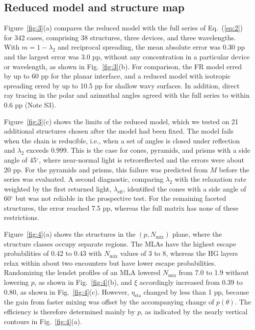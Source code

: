 \documentclass{optica-article}
\begin{document}
\subsection{Reduced model and structure map}

Figure~\ref{fig:3}(a) compares the reduced model with the full series of Eq.~(\ref{eq:2}) for 342 cases, comprising 38 structures, three devices, and three wavelengths. With $m = 1-\lambda_2$ and reciprocal spreading, the mean absolute error was 0.30 pp and the largest error was 3.0 pp, without any concentration in a particular device or wavelength, as shown in Fig.~\ref{fig:3}(b). For comparison, the FR model erred by up to 60 pp for the planar interface, and a reduced model with isotropic spreading erred by up to 10.5 pp for shallow wavy surfaces. In addition, direct ray tracing in the polar and azimuthal angles agreed with the full series to within 0.6 pp (Note S3).

Figure~\ref{fig:3}(c) shows the limits of the reduced model, which we tested on 21 additional structures chosen after the model had been fixed. The model fails when the chain is reducible, i.e., when a set of angles is closed under reflection and $\lambda_2$ exceeds 0.999. This is the case for cones, pyramids, and prisms with a side angle of 45\ensuremath{^\circ}, where near-normal light is retroreflected and the errors were about 20 pp. For the pyramids and prisms, this failure was predicted from $M$ before the series was evaluated. A second diagnostic, comparing $\lambda_2$ with the relaxation rate weighted by the first returned light, $\lambda_{\mathrm{eff}}$, identified the cones with a side angle of 60\ensuremath{^\circ} but was not reliable in the prospective test. For the remaining faceted structures, the error reached 7.5 pp, whereas the full matrix has none of these restrictions.

Figure~\ref{fig:4}(a) shows the structures in the $(p, N_{\mathrm{mix}})$ plane, where the structure classes occupy separate regions. The MLAs have the highest escape probabilities of 0.42 to 0.43 with $N_{\mathrm{mix}}$ values of 3 to 8, whereas the HG layers relax within about two encounters but have lower escape probabilities. Randomizing the lenslet profiles of an MLA lowered $N_{\mathrm{mix}}$ from 7.0 to 1.9 without lowering $p$, as shown in Fig.~\ref{fig:4}(b), and $\xi$ accordingly increased from 0.39 to 0.80, as shown in Fig.~\ref{fig:4}(c). However, $\eta_{\mathrm{sta}}$ changed by less than 1 pp, because the gain from faster mixing was offset by the accompanying change of $p(\theta)$. The efficiency is therefore determined mainly by $p$, as indicated by the nearly vertical contours in Fig.~\ref{fig:4}(a).
\end{document}
